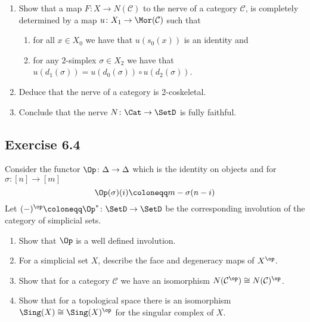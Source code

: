 \begin{enumerate}[label=(\alph*)]
     
     \item 
     Show that a map $ F \colon X  \to N ( \mathcal{ C } ) $ to the nerve of a category $ \mathcal{ C } $, is completely determined by a map $ u \colon X_1 \to \Mor ( \mathcal{ C } ) $ such that 
     \begin{enumerate}
         \item 
         for all $ x \in X_0 $ we have that $ u ( s_0 ( x ) ) $ is an identity and 

         \item 
         for any $2$-simplex $ \sigma \in X_2 $ we have that $ u ( d_1 ( \sigma ) ) = u ( d_0 ( \sigma ) ) \circ u ( d_2 ( \sigma ) )$.
     \end{enumerate}

     \item 
     Deduce that the nerve of a category is 2-coskeletal.

     \item 
     Conclude that the nerve $ N \colon \Cat \to \SetD $ is fully faithful.
     
\end{enumerate}

\subsection{ Exercise 6.4 }

Consider the functor $ \Op \colon \Delta \to \Delta $ which is the identity on objects and for $ \sigma : [ n ] \to [ m ] $
\[
    \Op ( \sigma ) ( i ) 
    \coloneqq
    m - \sigma ( n - i )
\]
Let $ ( - )^{ \op } \coloneqq \Op^* \colon \SetD \to \SetD $ be the corresponding involution of the category of simplicial sets.

\begin{enumerate}[label=(\alph*)]
    \item 
    Show that $ \Op $ is a well defined involution.

    \item 
    For a simplicial set $ X $, describe the face and degeneracy maps of $ X ^{ \op } $.

    \item 
    Show that for a category $ \mathcal{ C } $ we have an isomorphism $ N ( \mathcal{ C }^{\op} ) \cong N ( \mathcal{ C } )^{\op} $.

    \item   
    Show that for a topological space there is an isomorphism $ \Sing ( X ) \cong \Sing ( X )^{ \op } $ for the singular complex of $ X $.
\end{enumerate}

